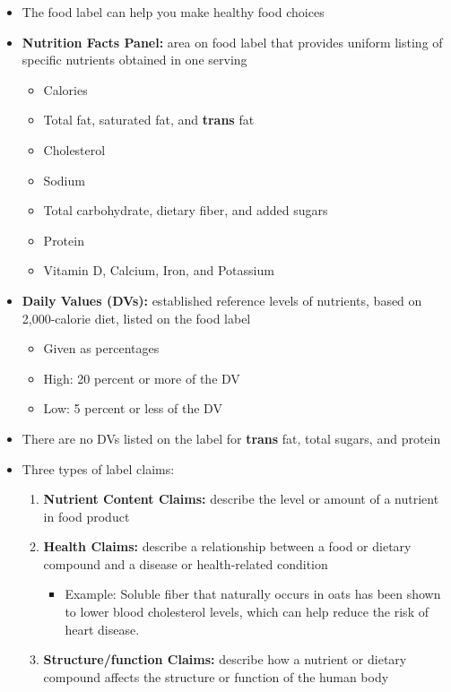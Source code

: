 \documentclass[12pt]{article}
\begin{document}
\begin{itemize}
\begin{itemize}
                    \end{itemize}
                \item The food label can help you make healthy food choices
                \item \textbf{Nutrition Facts Panel:} area on food label that provides uniform listing of specific nutrients obtained in one serving
                    \begin{itemize}
                        \item Calories
                        \item Total fat, saturated fat, and \textbf{trans} fat
                        \item Cholesterol
                        \item Sodium
                        \item Total carbohydrate, dietary fiber, and added sugars
                        \item Protein
                        \item Vitamin D, Calcium, Iron, and Potassium
                    \end{itemize}
                \item \textbf{Daily Values (DVs):} established reference levels of nutrients, based on 2,000-calorie diet, listed on the food label
                    \begin{itemize}
                        \item Given as percentages
                        \item High: 20 percent or more of the DV
                        \item Low: 5 percent or less of the DV
                    \end{itemize}
                \item There are no DVs listed on the label for \textbf{trans} fat, total sugars, and protein
                \item Three types of label claims:
                    \begin{enumerate}
                        \item \textbf{Nutrient Content Claims:} describe the level or amount of a nutrient in food product
                        \item \textbf{Health Claims:} describe a relationship between a food or dietary compound and a disease or health-related condition
                            \begin{itemize}
                                \item Example: Soluble fiber that naturally occurs in oats has been shown to lower blood cholesterol levels, which can help reduce the risk of heart disease.
                            \end{itemize}
                        \item \textbf{Structure/function Claims:} describe how a nutrient or dietary compound affects the structure or function of the human body
                    \end{enumerate}
            \end{itemize}
        
\end{document}
